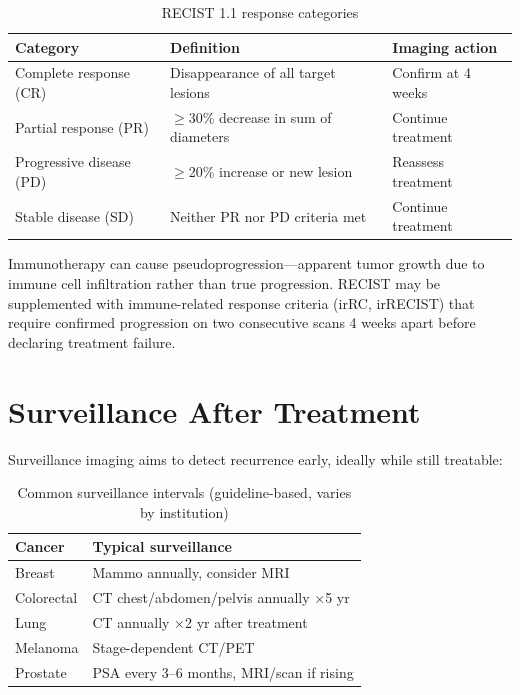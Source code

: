 \begin{table}[h]
\centering
\caption{RECIST 1.1 response categories}
\begin{tabular}{|p{}|p{}|p{}|}
\hline
\textbf{Category} & \textbf{Definition} & \textbf{Imaging action} \\
\hline
Complete response (CR) & Disappearance of all target lesions & Confirm at 4 weeks \\
Partial response (PR) & $\geq$30\% decrease in sum of diameters & Continue treatment \\
Progressive disease (PD) & $\geq$20\% increase or new lesion & Reassess treatment \\
Stable disease (SD) & Neither PR nor PD criteria met & Continue treatment \\
\hline
\end{tabular}
\end{table}

\begin{pearlbox}[Pseudoprogression]
Immunotherapy can cause pseudoprogression---apparent tumor growth due to immune cell infiltration rather than true progression. RECIST may be supplemented with immune-related response criteria (irRC, irRECIST) that require confirmed progression on two consecutive scans 4 weeks apart before declaring treatment failure.
\end{pearlbox}

\section{Surveillance After Treatment}
Surveillance imaging aims to detect recurrence early, ideally while still treatable:

\begin{table}[h]
\centering
\caption{Common surveillance intervals (guideline-based, varies by institution)}
\begin{tabular}{|l|l|}
\hline
\textbf{Cancer} & \textbf{Typical surveillance} \\
\hline
Breast & Mammo annually, consider MRI \\
Colorectal & CT chest/abdomen/pelvis annually $\times$5 yr \\
Lung & CT annually $\times$2 yr after treatment \\
Melanoma & Stage-dependent CT/PET \\
Prostate & PSA every 3--6 months, MRI/scan if rising \\
\hline
\end{tabular}
\end{table}

